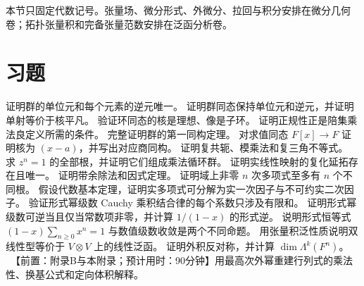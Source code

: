 \begin{remark}
本节只固定代数记号。张量场、微分形式、外微分、拉回与积分安排在微分几何卷；拓扑张量积和完备张量范数安排在泛函分析卷。
\end{remark}

\section*{习题}

\begin{enumerate}[label=\textbf{F.\arabic*.}]
  证明群的单位元和每个元素的逆元唯一。
  证明群同态保持单位元和逆元，并证明单射等价于核平凡。
  验证环同态的核是理想、像是子环。
  证明正规性正是陪集乘法良定义所需的条件。
  完整证明群的第一同构定理。
  对求值同态 \(F[x]\to F\) 证明核为 \((x-a)\)，并写出对应商同构。
  证明复共轭、模乘法和复三角不等式。
  求 \(z^n=1\) 的全部根，并证明它们组成乘法循环群。
  证明实线性映射的复化延拓存在且唯一。
  证明带余除法和因式定理。
  证明域上非零 \(n\) 次多项式至多有 \(n\) 个不同根。
  假设代数基本定理，证明实多项式可分解为实一次因子与不可约实二次因子。
  验证形式幂级数 Cauchy 乘积结合律的每个系数只涉及有限和。
  证明形式幂级数可逆当且仅当常数项非零，并计算 \(1/(1-x)\) 的形式逆。
  说明形式恒等式 \((1-x)\sum_{n\ge0}x^n=1\) 与数值级数收敛是两个不同命题。
  用张量积泛性质说明双线性型等价于 \(V\otimes V\) 上的线性泛函。
  证明外积反对称，并计算 \(\dim\Lambda^k(F^n)\)。
  \ 【前置：附录B与本附录；预计用时：90分钟】用最高次外幂重建行列式的乘法性、换基公式和定向体积解释。
\end{enumerate}
